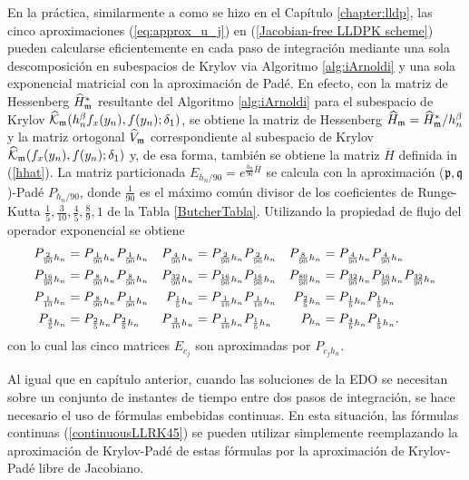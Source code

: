 En la práctica, similarmente a como se hizo en el Capítulo \ref{chapter:lldp}, las cinco aproximaciones (\ref{eq:approx_u_j}) en (\ref{Jacobian-free LLDPK scheme}) pueden calcularse eficientemente en cada paso de integración mediante una sola descomposición en subespacios de Krylov via Algoritmo \ref{alg:iArnoldi} y una sola exponencial matricial con la aproximación de Padé. En efecto, con la matriz de Hessenberg $\widehat{H}^*_{\mathfrak{m}}$ resultante del Algoritmo \ref{alg:iArnoldi} para el subespacio de Krylov $\widehat{\mathcal{K}}_{\mathfrak{m}}(h_n^\beta f_x(y_n),f(y_n);\delta_1)$, se obtiene la matriz de Hessenberg $\widehat{H}_{\mathfrak{m}}=\widehat{H}^*_{\mathfrak{m}}/h_n^{\beta}$ y la matriz ortogonal $\widehat{V}_{\mathfrak{m}}$ correspondiente al subespacio de Krylov  $\widehat{\mathcal{K}}_{\mathfrak{m}}(f_x(y_n),f(y_n);\delta_1)$ y, de esa forma, también se obtiene la matriz $\overline{H}$ definida in (\ref{hhat}). La matriz particionada $E_{h_n/90}=e^{\frac{h_n}{90}\overline{H}}$ se calcula con la aproximación ($\mathfrak{p},\mathfrak{q}$)-Padé $P_{h_n/90}$, donde $\frac{1}{ 90}$ es el máximo común divisor de los coeficientes de Runge-Kutta $\frac{1}{5},\frac{3}{10},\frac{4}{5},\frac{8}{9} ,1$ de la Tabla \ref{ButcherTabla}. Utilizando la propiedad de flujo del operador exponencial se obtiene
\begin{align}
P_{\frac{2}{90}h_{n}}& =P_{\frac{1}{90}h_{n}}P_{\frac{1}{90}h_{n}} & P_{%
	\frac{4}{90}h_{n}}& =P_{\frac{2}{90}h_{n}}P_{\frac{2}{90}h_{n}} & P_{\frac{8%
	}{90}h_{n}}& =P_{\frac{4}{90}h_{n}}P_{\frac{4}{90}h_{n}}  \notag \\
P_{\frac{16}{90}h_{n}}& =P_{\frac{8}{90}h_{n}}P_{\frac{8}{90}h_{n}} & P_{%
	\frac{32}{90}h_{n}}& =P_{\frac{16}{90}h_{n}}P_{\frac{16}{90}h_{n}} & P_{%
	\frac{80}{90}h_{n}}& =P_{\frac{32}{90}h_{n}}P_{\frac{16}{90}h_{n}}P_{\frac{32%
	}{90}h_{n}}  \label{flow2} \\
P_{\frac{1}{10}h_{n}}& =P_{\frac{8}{90}h_{n}}P_{\frac{1}{90}h_{n}} & P_{%
	\frac{1}{5}h_{n}}& =P_{\frac{1}{10}h_{n}}P_{\frac{1}{10}h_{n}} & P_{\frac{2}{%
		5}h_{n}}& =P_{\frac{1}{5}h_{n}}P_{\frac{1}{5}h_{n}}  \notag \\
P_{\frac{4}{5}h_{n}}& =P_{\frac{2}{5}h_{n}}P_{\frac{2}{5}h_{n}} & P_{\frac{3%
	}{10}h_{n}}& =P_{\frac{1}{10}h_{n}}P_{\frac{1}{5}h_{n}} & P_{h_{n}}& =P_{%
	\frac{4}{5}h_{n}}P_{\frac{1}{5}h_{n}}.  \notag
\end{align}
con lo cual las cinco matrices $E_{c_j}$ son aproximadas por $P_{c_j h_n}$.

Al igual que en capítulo anterior, cuando las soluciones de la EDO se necesitan sobre un conjunto de instantes de tiempo entre dos pasos de integración, se hace necesario el uso de fórmulas embebidas continuas.  En esta situación, las fórmulas continuas (\ref{continuousLLRK45}) se pueden utilizar simplemente reemplazando la aproximación de Krylov-Padé de estas fórmulas por la aproximación de Krylov-Padé libre de Jacobiano.

